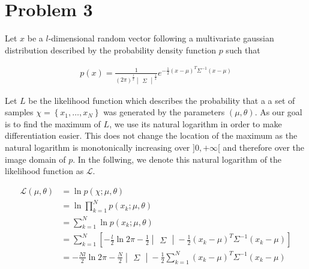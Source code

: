 \documentclass[a4paper, 10pt, twoside]{article}
\begin{document}
\section*{Problem 3}
Let $x$ be a $l$-dimensional random vector following a multivariate gaussian distribution described by the probability density function $p$ such that

\begin{align*}
    p(x) =
    \frac{1}{(2\pi)^\frac{l}{2} \begin{vmatrix} \Sigma \end{vmatrix}^\frac{1}{2}}
    e^{-\frac{1}{2} (x-\mu)^T \Sigma^{-1} (x-\mu)}
\end{align*}

Let $L$ be the likelihood function which describes the probability that a a set of samples $\chi = \left\{x_1, \dots, x_N\right\}$ was generated by the parameters $(\mu, \theta)$. As our goal is to find the maximum of $L$, we use its natural logarithm in order to make differentiation easier. This does not change the location of the maximum as the natural logarithm is monotonically increasing over $]0, +\infty$[ and therefore over the image domain of $p$. In the follwing, we denote this natural logarithm of the likelihood function as $\mathcal{L}$.

\begin{align*}
    \mathcal{L}(\mu, \theta)
     & = \ln p(\chi; \mu, \theta)                                                                                                               \\
     & = \ln \prod_{k=1}^N p(x_k; \mu, \theta)                                                                                                  \\
     & = \sum_{k=1}^N \ln p(x_k; \mu, \theta)                                                                                                   \\
     & = \sum_{k=1}^N \left[-\frac{l}{2} \ln 2\pi -\frac{1}{2} \begin{vmatrix} \Sigma \end{vmatrix} -\frac{1}{2} (x_k-\mu)^T \Sigma^{-1} (x_k-\mu)\right] \\
     & = -\frac{Nl}{2} \ln 2\pi -\frac{N}{2} \begin{vmatrix} \Sigma \end{vmatrix} -\frac{1}{2} \sum_{k=1}^N (x_k-\mu)^T \Sigma^{-1} (x_k-\mu)             \\
\end{align*}
\end{document}
